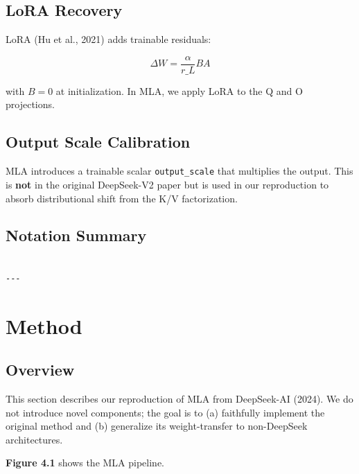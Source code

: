 \subsection{LoRA Recovery}

LoRA (Hu et al., 2021) adds trainable residuals:

\[
\Delta W = \frac{\alpha}{r\_L} B A
\tag{3.11}
\]

with $B = 0$ at initialization. In MLA, we apply LoRA to the Q and O 
projections.

\subsection{Output Scale Calibration}

MLA introduces a trainable scalar \texttt{output\_scale} that multiplies the 
output. This is \textbf{not} in the original DeepSeek-V2 paper but is used in 
our reproduction to absorb distributional shift from the K/V factorization.

\subsection{Notation Summary}

\begin{lstlisting}

---
\end{lstlisting}


\section{Method}

\subsection{Overview}

This section describes our reproduction of MLA from DeepSeek-AI (2024). We 
do not introduce novel components; the goal is to (a) faithfully implement 
the original method and (b) generalize its weight-transfer to 
non-DeepSeek architectures.

\textbf{Figure 4.1} shows the MLA pipeline.

